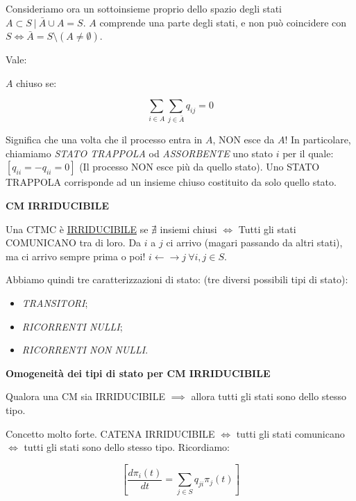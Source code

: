 Consideriamo ora un sottoinsieme proprio dello spazio degli stati $A\subset S\ |\ \bar{A} \cup A = S$. $A$ comprende una parte degli stati, e non può coincidere con $S \iff \bar{A} = S \setminus (A\neq \emptyset)$.

Vale:

\begin{thrm}
$A$ chiuso se:

\[
	\sum_{i\in A}{\sum_{j\in\bar{A}}{q_{ij}}} = 0
\]
\end{thrm}

Significa che una volta che il processo entra in $A$, NON esce da $A$! In particolare, chiamiamo \textit{STATO TRAPPOLA} od \textit{ASSORBENTE} uno stato $i$ per il quale: $ [q_{ii} = -q_{ii} = 0]$ (Il processo NON esce più da quello stato). Uno STATO TRAPPOLA corrisponde ad un insieme chiuso costituito da solo quello stato.

\begin{defn}{\textbf{CM IRRIDUCIBILE}}

Una CTMC è \underline{\underline{IRRIDUCIBILE}} se $\nexists$ insiemi chiusi $\iff$ Tutti gli stati COMUNICANO tra di loro. Da $i$ a $j$ ci arrivo (magari passando da altri stati), ma ci arrivo sempre prima o poi! $i \leftarrow\rightarrow j\ \forall i,j\in S$.

\end{defn}

Abbiamo quindi tre caratterizzazioni di stato: (tre diversi possibili tipi di stato):

\begin{itemize}

\item{\textit{TRANSITORI}};
\item{\textit{RICORRENTI NULLI}};
\item{\textit{RICORRENTI NON NULLI}}.

\end{itemize}

\begin{corl}{\textbf{Omogeneità dei tipi di stato per CM IRRIDUCIBILE}}

Qualora una CM sia IRRIDUCIBILE $\implies$ allora tutti gli stati sono dello stesso tipo.

\end{corl}

Concetto molto forte. CATENA IRRIDUCIBILE $\iff$ tutti gli stati comunicano $\iff$ tutti gli stati sono dello stesso tipo. Ricordiamo:

\[
	[\frac{d \pi_i(t)}{dt} = \sum_{j\in S}{q_{ji}\pi_j(t)}]
\]

